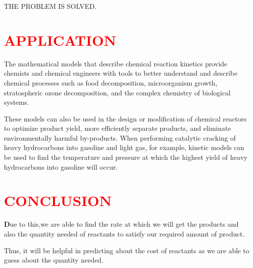 \documentclass[12pt]{article}
\begin{document}
         THE PROBLEM IS SOLVED.
         \newpage
\section{\textcolor{red}{ APPLICATION }}
\textsf
The mathematical models that describe chemical reaction kinetics provide chemists and chemical engineers with tools to better understand and describe chemical processes such as food decomposition, microorganism growth, stratospheric ozone decomposition, and the complex chemistry of biological systems. 

        These models can also be used in the design or modification of chemical reactors to optimize product yield, more efficiently separate products, and eliminate environmentally harmful by-products. When performing catalytic cracking of heavy hydrocarbons into gasoline and light gas, for example, kinetic models can be used to find the temperature and pressure at which the highest yield of heavy hydrocarbons into gasoline will occur.
        
       
\section{\textcolor{red}{CONCLUSION}}
\textbf
Due to this,we are able to find the rate at which we will get the products and also the quantity needed of reactants to satisfy our required amount of product.
 
        Thus, it will be helpful in predicting about the cost of reactants as we are able to guess about the quantity needed.
        \cite{1}
        \cite{2}
        \cite{3}
        \cite{4}
\newpage        
 
 
 
        

 


\fontsize{50}{50}\selectfont{ THANK  YOU !!!}
\end{document}
